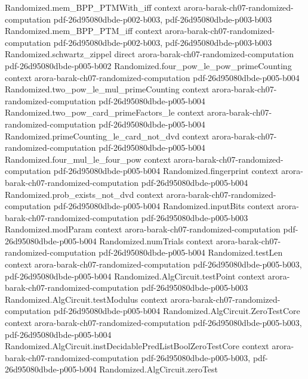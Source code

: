 \begin{theorem}
\proofstep
  {Randomized.mem_BPP_PTMWith_iff}
  {context}
  {arora-barak-ch07-randomized-computation}
  {pdf-26d95080dbde-p002-b003,
    pdf-26d95080dbde-p003-b003}
\proofstep
  {Randomized.mem_BPP_PTM_iff}
  {context}
  {arora-barak-ch07-randomized-computation}
  {pdf-26d95080dbde-p002-b003,
    pdf-26d95080dbde-p003-b003}
\proofstep
  {Randomized.schwartz_zippel}
  {direct}
  {arora-barak-ch07-randomized-computation}
  {pdf-26d95080dbde-p005-b002}
\proofstep
  {Randomized.four_pow_le_pow_primeCounting}
  {context}
  {arora-barak-ch07-randomized-computation}
  {pdf-26d95080dbde-p005-b004}
\proofstep
  {Randomized.two_pow_le_mul_primeCounting}
  {context}
  {arora-barak-ch07-randomized-computation}
  {pdf-26d95080dbde-p005-b004}
\proofstep
  {Randomized.two_pow_card_primeFactors_le}
  {context}
  {arora-barak-ch07-randomized-computation}
  {pdf-26d95080dbde-p005-b004}
\proofstep
  {Randomized.primeCounting_le_card_not_dvd}
  {context}
  {arora-barak-ch07-randomized-computation}
  {pdf-26d95080dbde-p005-b004}
\proofstep
  {Randomized.four_mul_le_four_pow}
  {context}
  {arora-barak-ch07-randomized-computation}
  {pdf-26d95080dbde-p005-b004}
\proofstep
  {Randomized.fingerprint}
  {context}
  {arora-barak-ch07-randomized-computation}
  {pdf-26d95080dbde-p005-b004}
\proofstep
  {Randomized.prob_exists_not_dvd}
  {context}
  {arora-barak-ch07-randomized-computation}
  {pdf-26d95080dbde-p005-b004}
\proofstep
  {Randomized.inputBits}
  {context}
  {arora-barak-ch07-randomized-computation}
  {pdf-26d95080dbde-p005-b003}
\proofstep
  {Randomized.modParam}
  {context}
  {arora-barak-ch07-randomized-computation}
  {pdf-26d95080dbde-p005-b004}
\proofstep
  {Randomized.numTrials}
  {context}
  {arora-barak-ch07-randomized-computation}
  {pdf-26d95080dbde-p005-b004}
\proofstep
  {Randomized.testLen}
  {context}
  {arora-barak-ch07-randomized-computation}
  {pdf-26d95080dbde-p005-b003,
    pdf-26d95080dbde-p005-b004}
\proofstep
  {Randomized.AlgCircuit.testPoint}
  {context}
  {arora-barak-ch07-randomized-computation}
  {pdf-26d95080dbde-p005-b003}
\proofstep
  {Randomized.AlgCircuit.testModulus}
  {context}
  {arora-barak-ch07-randomized-computation}
  {pdf-26d95080dbde-p005-b004}
\proofstep
  {Randomized.AlgCircuit.ZeroTestCore}
  {context}
  {arora-barak-ch07-randomized-computation}
  {pdf-26d95080dbde-p005-b003,
    pdf-26d95080dbde-p005-b004}
\proofstep
  {Randomized.AlgCircuit.instDecidablePredListBoolZeroTestCore}
  {context}
  {arora-barak-ch07-randomized-computation}
  {pdf-26d95080dbde-p005-b003,
    pdf-26d95080dbde-p005-b004}
\proofstep
  {Randomized.AlgCircuit.zeroTest}

\end{theorem}
